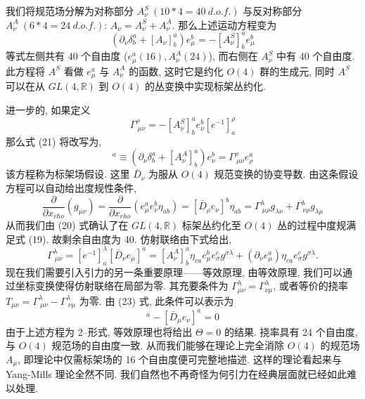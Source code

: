 \documentclass{article}
\begin{document}
我们将规范场分解为对称部分 $A_{\nu}^{S}\ (10*4=40\ d.o.f.)$ 与反对称部分 $A_{\nu}^{A}\ (6*4=24\ d.o.f.)$: $A_{\nu}=A_{\nu}^{S}+A_{\nu}^{A}$. 那么上述运动方程变为
\begin{equation}
(\partial_{\nu}\delta_{b}^{a}+[A_{\nu}]^{a}_{b})e_{\mu}^{b}=-[A_{\nu}^{S}]_{b}^{a}e_{\mu}^{b}
\end{equation}
等式左侧共有 40 个自由度 ($e_{\mu}^{a}(16),A_{\nu}^{A}(24)$), 而右侧在 $A_{\nu}^{S}$ 中有 40 个自由度. 此方程将 $A^{S}$ 看做 $e_{\mu}^{a}$ 与 $A_{\nu}^{A}$ 的函数, 这时它是约化 $O(4)$ 群的生成元, 同时 $A^{S}$ 可以在从 $GL(4,\mathbb{R})$ 到 $O(4)$ 的丛变换中实现标架丛约化.

进一步的, 如果定义
\begin{equation}
\Gamma_{\ \mu\nu}^{\rho}=-[A^{S}_{\nu}]^{a}_{b}e_{\nu}^{b}[e^{-1}]^{\rho}_{a}
\end{equation}
那么式 (21) 将改写为,
\begin{equation}
[\bar{D}_{\nu}e_{\mu}]^{a}\equiv (\partial_{\nu}\delta_{b}^{a}+[A_{\nu}^{A}]^{a}_{b})e_{\nu}^{b}=\Gamma^{\rho}_{\ \mu\nu}e_{\rho}^{a}
\end{equation}
该方程称为标架场假设. 这里 $\bar{D}_{\nu}$ 为服从 $O(4)$ 规范变换的协变导数. 由这条假设方程可以自动给出度规性条件,
\begin{equation}
\frac{\partial }{\partial x_{rho}}(g_{\mu\nu})=\frac{\partial }{\partial x_{rho}}(e_{\mu}^{a}e_{\nu}^{b}\eta_{ab})=[\bar{D}_{\rho}e_{\nu}]^{b}\eta_{ab}=\Gamma^{\lambda}_{\ \mu\rho}g_{\lambda\nu}+\Gamma^{\lambda}_{\ \nu\rho}g_{\lambda\mu}
\end{equation}
从而我们由 (20) 式确认了在 $GL(4,\mathbb{R})$ 标架丛约化至 $O(4)$ 丛的过程中度规满足式 (19). 故剩余自由度为 40. 仿射联络由下式给出,
\begin{equation}
\Gamma_{\ \mu\nu}^{\lambda}=[e^{-1}]^{\lambda}_{a}[\bar{D}_{\nu}e_{\mu}]^{a}=[A_{\nu}^{A}]_{b}^{a}\eta_{ca}e_{\mu}^{b}e_{\sigma}^{c}g^{\sigma\lambda}+(\partial_{\nu}e_{\mu}^{a})\eta_{ca}e_{\sigma}^{c}g^{\sigma\lambda}.
\end{equation}
现在我们需要引入引力的另一条重要原理——等效原理, 由等效原理, 我们可以通过坐标变换使得仿射联络在局部为零. 其充要条件为 $\Gamma_{\mu\nu}^{\lambda}=\Gamma_{\nu\mu}^{\lambda}$, 或者等价的挠率 $T_{\mu\nu}=\Gamma_{\ \mu\nu}^{\lambda}-\Gamma_{\ \nu\mu}^{\lambda}$ 为零. 由 (23) 式, 此条件可以表示为
\begin{equation}
[\bar{D}_{\nu}e_{\mu}]^{a}-[\bar{D}_{\mu}e_{\nu}]^{a}=0
\end{equation}
由于上述方程为 2--形式, 等效原理也将给出 $\Theta=0$ 的结果. 挠率具有 24 个自由度, 与 $O(4)$ 规范场的自由度一致. 从而我们能够在理论上完全消除 $O(4)$ 的规范场 $A_{\mu}$, 即理论中仅需标架场的 16 个自由度便可完整地描述. 这样的理论看起来与 Yang-Mills 理论全然不同. 我们自然也不再奇怪为何引力在经典层面就已经如此难以处理.
\end{document}
